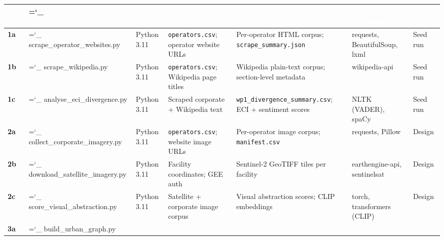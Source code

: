 \begin{fullwidth}
\tiny
{}
\setlength{\tabcolsep}{3pt}
\renewcommand{\arraystretch}{1.1}
\begin{tabularx}{\linewidth}{%
  >{\centering}p{0.6cm}
  >{\ttfamily\raggedright\hyphenchar\font=`\_}p{5.0cm}
  >{\raggedright}p{1.6cm}
  >{\raggedright}X
  >{\raggedright}X
  >{\raggedright}p{3.0cm}
  >{\raggedright\arraybackslash}p{1.4cm}}
\toprule
\rowcolor{dcblue}
\textcolor{white}{\textbf{WP}} &
\textcolor{white}{\textbf{Script}} &
\textcolor{white}{\textbf{Lang.}} &
\textcolor{white}{\textbf{Key inputs}} &
\textcolor{white}{\textbf{Key outputs}} &
\textcolor{white}{\textbf{Core dependencies}} &
\textcolor{white}{\textbf{Status}} \\
\midrule
\textbf{1a} &
  scrape\_operator\_websites.py &
  Python 3.11 &
  \texttt{operators.csv}; operator website URLs &
  Per-operator HTML corpus; \texttt{scrape\_summary.json} &
  requests, BeautifulSoup, lxml &
  Seed run \\
\addlinespace[2pt]
\rowcolor{dcgray}
\textbf{1b} &
  scrape\_wikipedia.py &
  Python 3.11 &
  \texttt{operators.csv}; Wikipedia page titles &
  Wikipedia plain-text corpus; section-level metadata &
  wikipedia-api &
  Seed run \\
\addlinespace[2pt]
\textbf{1c} &
  analyse\_eci\_divergence.py &
  Python 3.11 &
  Scraped corporate + Wikipedia text &
  \texttt{wp1\_divergence\_summary.csv}; ECI + sentiment scores &
  NLTK (VADER), spaCy &
  Seed run \\
\addlinespace[2pt]
\rowcolor{dcgray}
\textbf{2a} &
  collect\_corporate\_imagery.py &
  Python 3.11 &
  \texttt{operators.csv}; website image URLs &
  Per-operator image corpus; \texttt{manifest.csv} &
  requests, Pillow &
  Design \\
\addlinespace[2pt]
\textbf{2b} &
  download\_satellite\_imagery.py &
  Python 3.11 &
  Facility coordinates; GEE auth &
  Sentinel-2 GeoTIFF tiles per facility &
  earthengine-api, sentinelsat &
  Design \\
\addlinespace[2pt]
\rowcolor{dcgray}
\textbf{2c} &
  score\_visual\_abstraction.py &
  Python 3.11 &
  Satellite + corporate image corpus &
  Visual abstraction scores; CLIP embeddings &
  torch, transformers (CLIP) &
  Design \\
\addlinespace[2pt]
\textbf{3a} &
  build\_urban\_graph.py &

\end{tabularx}
\end{fullwidth}
